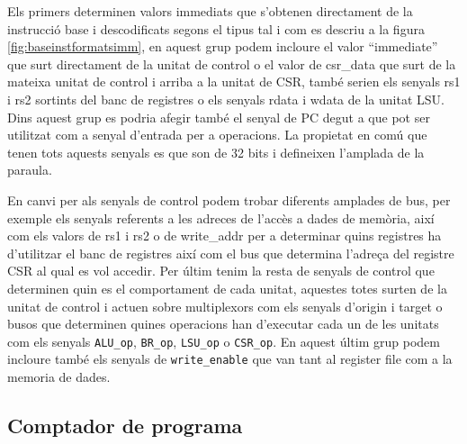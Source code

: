 \documentclass[10pt,a4paper,twocolumn,twoside]{article}
\begin{document}
        Els primers determinen valors immediats que s'obtenen directament de la instrucció base i descodificats segons el tipus tal i com es descriu a la figura \ref{fig:baseinstformatsimm}, en aquest grup podem incloure el valor ``immediate'' que surt directament de la unitat de control o el valor de csr\_data que surt de la mateixa unitat de control i arriba a la unitat de CSR, també serien els senyals rs1 i rs2 sortints del banc de registres o els senyals rdata i wdata de la unitat LSU. Dins aquest grup es podria afegir també el senyal de PC degut a que pot ser utilitzat com a senyal d'entrada per a operacions. La propietat en comú que tenen tots aquests senyals es que son de 32 bits i defineixen l'amplada de la paraula.
        
        En canvi per als senyals de control podem trobar diferents amplades de bus, per exemple els senyals referents a les adreces de l'accès a dades de memòria, així com els valors de rs1 i rs2 o de write\_addr per a determinar quins registres ha d'utilitzar el banc de registres així com el bus que determina l'adreça del registre CSR al qual es vol accedir. Per últim tenim la resta de senyals de control que determinen quin es el comportament de cada unitat, aquestes totes surten de la unitat de control i actuen sobre multiplexors com els senyals d'origin i target o busos que determinen quines operacions han d'executar cada un de les unitats com els senyals \verb|ALU_op|, \verb|BR_op|, \verb|LSU_op| o \verb|CSR_op|. En aquest últim grup podem incloure també els senyals de \verb|write_enable| que van tant al register file com a la memoria de dades.
        
        
        
        

        
        
        
        
        
    \subsection{Comptador de programa}
    
\end{document}
